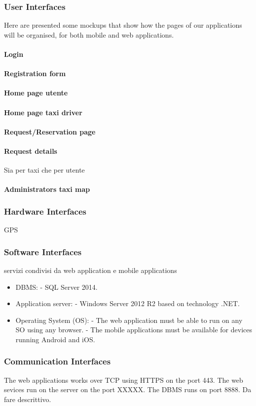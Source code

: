 \subsubsection{User Interfaces}
	Here are presented some mockups that show how the pages of our applications will be organised, for both mobile and web applications.
	\paragraph{Login}
	\paragraph{Registration form}
	\paragraph{Home page utente}
	\paragraph{Home page taxi driver}
	\paragraph{Request/Reservation page}
	\paragraph{Request details} Sia per taxi che per utente
	\paragraph{Administrators taxi map}
	
\subsubsection{Hardware Interfaces}
	GPS
	
\subsubsection{Software Interfaces}
	servizi condivisi da web application e mobile applications
	\begin{itemize}
		\item DBMS: \newline
		- SQL Server 2014.
		\item Application server: \newline
		- Windows Server 2012 R2 based on technology .NET.
		\item Operating System (OS): \newline
		- The web application must be able to run on any SO using any browser. \newline
		- The mobile applications must be available for devices running Android and iOS.
	\end{itemize}
	
\subsubsection{Communication Interfaces}
	The web applications works over TCP using HTTPS on the port 443.\newline
	The web sevices run on the server on the port XXXXX.\newline
	The DBMS runs on port 8888.
	Da fare descrittivo.